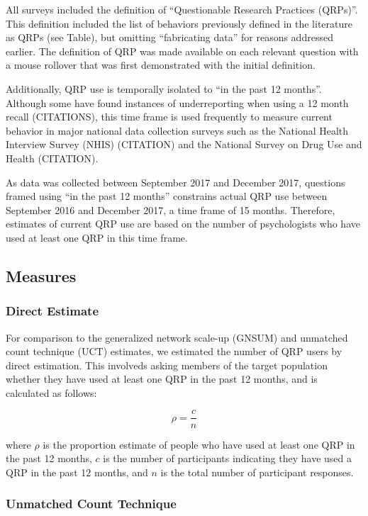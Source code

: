 \documentclass[,jou]{apa6}
\theoremstyle{definition}
\theoremstyle{definition}
\theoremstyle{definition}
\theoremstyle{remark}
\begin{document}
All surveys included the definition of \enquote{Questionable Research
Practices (QRPs)}. This definition included the list of behaviors
previously defined in the literature as QRPs (see Table), but omitting
\enquote{fabricating data} for reasons addressed earlier. The definition
of QRP was made available on each relevant question with a mouse
rollover that was first demonstrated with the initial definition.

Additionally, QRP use is temporally isolated to \enquote{in the past 12
months}. Although some have found instances of underreporting when using
a 12 month recall (CITATIONS), this time frame is used frequently to
measure current behavior in major national data collection surveys such
as the National Health Interview Survey (NHIS) (CITATION) and the
National Survey on Drug Use and Health (CITATION).

As data was collected between September 2017 and December 2017,
questions framed using \enquote{in the past 12 months} constrains actual
QRP use between September 2016 and December 2017, a time frame of 15
months. Therefore, estimates of current QRP use are based on the number
of psychologists who have used at least one QRP in this time frame.

\subsection{Measures}\label{measures}

\subsubsection{Direct Estimate}\label{direct-estimate}

For comparison to the generalized network scale-up (GNSUM) and unmatched
count technique (UCT) estimates, we estimated the number of QRP users by
direct estimation. This involveds asking members of the target
population whether they have used at least one QRP in the past 12
months, and is calculated as follows:

\begin{equation}
\rho = \frac{c}{n}
\end{equation}

where \(\rho\) is the proportion estimate of people who have used at
least one QRP in the past 12 months, \(c\) is the number of participants
indicating they have used a QRP in the past 12 months, and \(n\) is the
total number of participant responses.

\subsubsection{Unmatched Count
Technique}\label{unmatched-count-technique}
\end{document}
